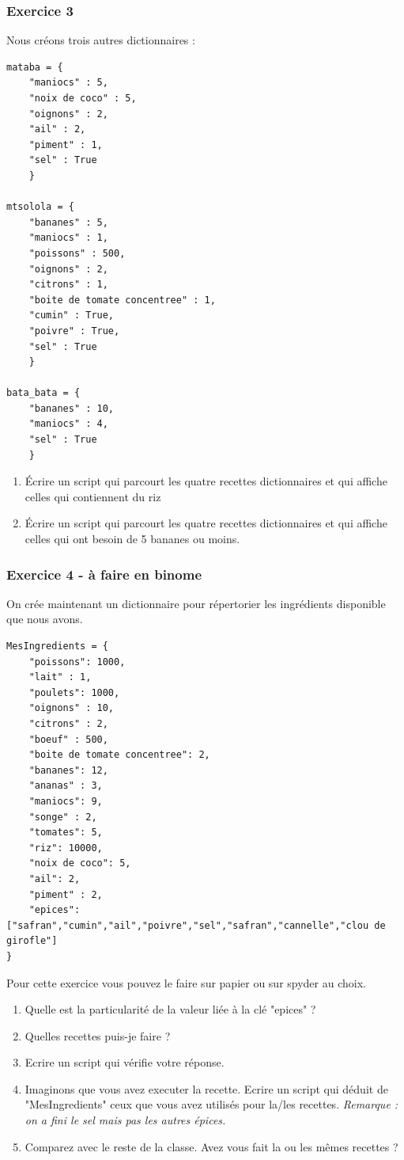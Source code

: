 \subsubsection*{Exercice 3}
Nous créons trois autres dictionnaires :
\begin{lstlisting}
mataba = {
    "maniocs" : 5,
    "noix de coco" : 5,
    "oignons" : 2,
    "ail" : 2,
    "piment" : 1,
    "sel" : True
    }

mtsolola = {
    "bananes" : 5,
    "maniocs" : 1,
    "poissons" : 500,
    "oignons" : 2,
    "citrons" : 1, 
    "boite de tomate concentree" : 1,
    "cumin" : True,
    "poivre" : True,
    "sel" : True
    }

bata_bata = {
    "bananes" : 10,
    "maniocs" : 4,
    "sel" : True
    }
\end{lstlisting}
\begin{enumerate}
    \item Écrire un script qui parcourt les quatre recettes dictionnaires et qui affiche celles qui contiennent du riz
    \item Écrire un script qui parcourt les quatre recettes dictionnaires et qui affiche celles qui ont besoin de 5 bananes ou moins.
\end{enumerate}


\subsubsection*{Exercice 4 - à faire en binome}
On crée maintenant un dictionnaire pour répertorier les ingrédients disponible que nous avons.
\begin{lstlisting}
MesIngredients = {
    "poissons": 1000,
    "lait" : 1,
    "poulets": 1000,
    "oignons" : 10,
    "citrons" : 2,
    "boeuf" : 500,
    "boite de tomate concentree": 2,
    "bananes": 12,
    "ananas" : 3,
    "maniocs": 9,
    "songe" : 2,
    "tomates": 5,
    "riz": 10000,
    "noix de coco": 5,
    "ail": 2,
    "piment" : 2,
    "epices": ["safran","cumin","ail","poivre","sel","safran","cannelle","clou de girofle"]
}
\end{lstlisting}

Pour cette exercice vous pouvez le faire sur papier ou sur spyder au choix.

\begin{enumerate}
    \item Quelle est la particularité de la valeur liée à la clé "epices" ?
    \item Quelles recettes puis-je faire ?
    \item Ecrire un script qui vérifie votre réponse.
    \item Imaginons que vous avez executer la recette. Ecrire un script qui déduit de "MesIngredients" ceux que vous avez utilisés pour la/les recettes. \textit{Remarque : on a fini le sel mais pas les autres épices.}
    \item Comparez avec le reste de la classe. Avez vous fait la ou les mêmes recettes ?
\end{enumerate}






